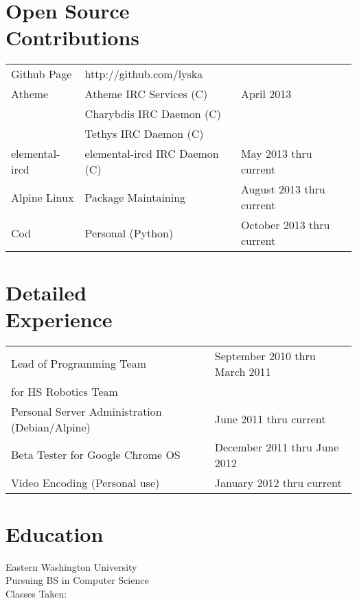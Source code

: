\documentclass[line, margin]{res}
\begin{document}
\address{5539 Columbia Pike Apt 809 \\ Arlington, VA 22204 \\ +1 (425) 221-7761}

\begin{resume}

	\section{Open Source \\ Contributions}
	\begin{tabular}{l l l}
		Github Page & \hfill http://github.com/lyska & \\ [5pt]
		Atheme & \hfill Atheme IRC Services (C) & \hfill April 2013 \\ 
	 & \hfill Charybdis IRC Daemon (C) \\
	 & \hfill Tethys IRC Daemon (C) \\
		elemental-ircd & \hfill elemental-ircd IRC Daemon (C) & \hfill May 2013 thru current \\
		Alpine Linux & \hfill Package Maintaining & \hfill August 2013 thru current \\
		Cod & \hfill Personal (Python) & \hfill October 2013 thru current
	\end{tabular}

	\section{Detailed \\ Experience}
	\begin{tabular}{l l}
		Lead of Programming Team & \hfill September 2010 thru March 2011 \\ 
		for HS Robotics Team & \\
		Personal Server Administration (Debian/Alpine) & \hfill June 2011 thru current  \\
		Beta Tester for Google Chrome OS & \hfill December 2011 thru June 2012 \\
		Video Encoding (Personal use) & January 2012 thru current \\
	\end{tabular}


	\section{Education}

	Eastern Washington University \\ Pursuing BS in Computer Science \\
	Classes Taken:


\end{resume}
\end{document}

